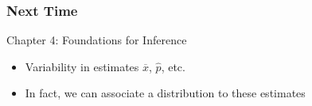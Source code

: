\documentclass[handout]{beamer}
\newcommand{\blue}[1]{\textcolor{blue2}{#1}}
\begin{document}
\begin{frame}[fragile]
\frametitle{Next Time}

Chapter 4:  Foundations for Inference
\begin{itemize}
\item Variability in estimates $\overline{x}$, $\widehat{p}$, etc.
\item In fact, we can associate a \blue{distribution} to these estimates
\end{itemize}


\end{frame}
\end{document}
